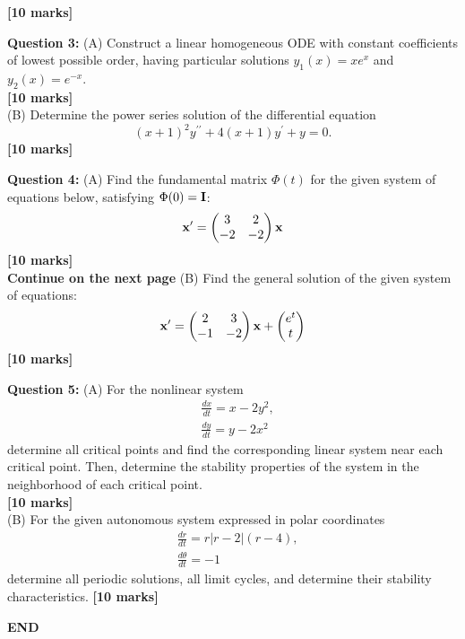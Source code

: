 \documentclass[11pt,a4paper]{article}
\begin{document}
	\hfill\textbf{[10 marks]}\par
	\textbf{Question 3:} (A) Construct a linear homogeneous ODE with constant coefficients of lowest possible order, having particular solutions $y_1(x) = xe^x$ and $y_2(x) = e^{-x}$.\\
	\hspace*{0pt}\hfill\textbf{[10 marks]}\\
	(B) Determine the power series solution of the differential equation
	$$
	(x+1)^2y^{\prime\prime} + 4(x+1)y^\prime + y = 0.
	$$
	\hfill\textbf{[10 marks]}\par
	\textbf{Question 4:} (A) Find the fundamental matrix $\Phi(t)$ for the given system of equations below, satisfying $\Phi(0) = \vb{I}$:
	$$
	\vb{x^\prime} =
	\begin{pmatrix}
		3 & 2\\
		-2 & -2
	\end{pmatrix}\vb{x}
	$$
	\hfill\textbf{[10 marks]}\\
	\hspace*{0pt}\hfill\textbf{Continue on the next page}
	\newpage
	(B) Find the general solution of the given system of equations:
	$$
	\vb{x^\prime} = 
	\begin{pmatrix}
		2 & 3\\
		-1 & -2
	\end{pmatrix}\vb{x} + 
	\begin{pmatrix}
		e^t\\
		t
	\end{pmatrix}
	$$
	\hfill\textbf{[10 marks]}\par
	\textbf{Question 5:} (A) For the nonlinear system
	\begin{align*}
		&\frac{dx}{dt} = x-2y^2,\\
		&\frac{dy}{dt} = y-2x^2
	\end{align*}
	determine all critical points and find the corresponding linear system near each critical point. Then, determine the stability properties of the system in the neighborhood of each critical point.\\
	\hspace*{0pt}\hfill\textbf{[10 marks]}\\
	(B) For the given autonomous system expressed in polar coordinates
	\begin{align*}
		&\frac{dr}{dt} = r|r-2|(r-4),\\
		&\frac{d\theta}{dt} = -1
	\end{align*}
	determine all periodic solutions, all limit cycles, and determine their stability characteristics.
	\hspace*{0pt}\hfill\textbf{[10 marks]}\par
	\vfill
	\centering
	\textbf{END}
\end{document}
